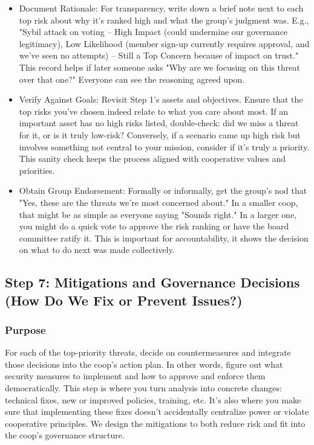\begin{itemize}
    \item Document Rationale: For transparency, write down a brief note next to each top risk about why it's
    ranked high and what the group's judgment was. E.g., "Sybil attack on voting – High Impact (could undermine
    our governance legitimacy), Low Likelihood (member sign-up currently requires approval, and we've seen no
    attempts) – Still a Top Concern because of impact on trust." This record helps if later someone asks "Why are
    we focusing on this threat over that one?" Everyone can see the reasoning agreed upon.
    
    \item Verify Against Goals: Revisit Step 1's assets and objectives. Ensure that the top risks you've
    chosen indeed relate to what you care about most. If an important asset has no high risks listed,
    double-check: did we miss a threat for it, or is it truly low-risk? Conversely, if a scenario came up high
    risk but involves something not central to your mission, consider if it's truly a priority. This sanity check
    keeps the process aligned with cooperative values and priorities.
    
    \item Obtain Group Endorsement: Formally or informally, get the group's nod that "Yes, these are the
    threats we're most concerned about." In a smaller coop, that might be as simple as everyone saying "Sounds
    right." In a larger one, you might do a quick vote to approve the risk ranking or have the board
    committee ratify it. This is important for accountability, it shows the decision on what to do next was made
    collectively.
\end{itemize}

\subsection{Step 7: Mitigations and Governance Decisions (How Do We Fix or Prevent Issues?)}
\label{subsec:Step7}

\subsubsection{Purpose}

For each of the top-priority threats, decide on countermeasures and integrate
those decisions into the coop's action plan. In other words, figure out what
security measures to implement and how to approve and enforce them
democratically. This step is where you turn analysis into concrete changes:
technical fixes, new or improved policies, training, etc. It's also where you
make sure that implementing these fixes doesn't accidentally centralize power or
violate cooperative principles. We design the mitigations to both reduce risk
and fit into the coop's governance structure.

